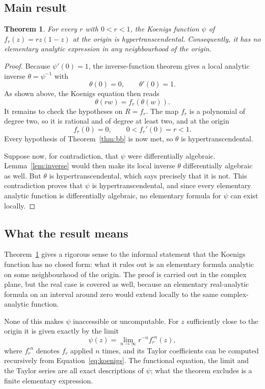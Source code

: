 \documentclass[11pt]{article}
\newtheorem{theorem}{Theorem}
\begin{document}
\subsection{Main result}

\begin{theorem}\label{thm:main}
For every $r$ with $0<r<1$, the Koenigs function $\psi$ of $f_r(z)=rz(1-z)$ at the origin is hypertranscendental. Consequently, it has no elementary analytic expression in any neighbourhood of the origin.
\end{theorem}

\begin{proof}
Because $\psi'(0)=1$, the inverse-function theorem gives a local analytic inverse $\theta=\psi^{-1}$ with
\[
 \theta(0)=0,
 \qquad
 \theta'(0)=1.
\]
As shown above, the Koenigs equation then reads
\[
 \theta(rw)=f_r(\theta(w)).
\]
It remains to check the hypotheses on $R=f_r$. The map $f_r$ is a polynomial of degree two, so it is rational and of degree at least two, and at the origin
\[
 f_r(0)=0,
 \qquad
 0<f_r'(0)=r<1.
\]
Every hypothesis of Theorem~\ref{thm:bb} is now met, so $\theta$ is hypertranscendental.

Suppose now, for contradiction, that $\psi$ were differentially algebraic. Lemma~\ref{lem:inverse} would then make its local inverse $\theta$ differentially algebraic as well. But $\theta$ is hypertranscendental, which says precisely that it is not. This contradiction proves that $\psi$ is hypertranscendental, and since every elementary analytic function is differentially algebraic, no elementary formula for $\psi$ can exist locally.
\end{proof}

\subsection{What the result means}

Theorem~\ref{thm:main} gives a rigorous sense to the informal statement that the Koenigs function has no closed form: what it rules out is an elementary formula analytic on some neighbourhood of the origin. The proof is carried out in the complex plane, but the real case is covered as well, because an elementary real-analytic formula on an interval around zero would extend locally to the same complex-analytic function.

None of this makes $\psi$ inaccessible or uncomputable. For $z$ sufficiently close to the origin it is given exactly by the limit
\begin{equation}\label{eq:limit}
 \psi(z)=\lim_{n\to\infty} r^{-n}f_r^{\circ n}(z),
\end{equation}
where $f_r^{\circ n}$ denotes $f_r$ applied $n$ times, and its Taylor coefficients can be computed recursively from Equation~\eqref{eq:koenigs}. The functional equation, the limit and the Taylor series are all exact descriptions of $\psi$; what the theorem excludes is a finite elementary expression.
\end{document}
